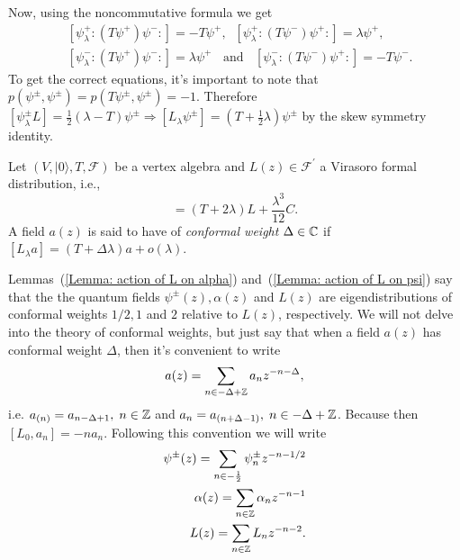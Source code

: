 Now, using the noncommutative formula we get
\begin{equation}
\begin{split}
     &[\psi^+_\lambda :(T\psi^+)\psi^-:]=-T\psi^+,\;\;[\psi^+_\lambda:(T\psi^-)\psi^+:]=\lambda\psi^+,\\
      &[\psi^-_\lambda :(T\psi^+)\psi^-:]=\lambda\psi^+\;\;\text{ and }\;\;[\psi^-_\lambda:(T\psi^-)\psi^+:]=-T\psi^-.
\end{split}
\end{equation}
To get the correct equations, it's important to note that $p(\psi^\pm,\psi^\pm)=p(T\psi^\pm,\psi^\pm)=-1$. Therefore $[\psi^\pm_\lambda L]=\frac{1}{2}(\lambda-T)\psi^\pm\Rightarrow [L_\lambda\psi^\pm]=(T+\frac{1}{2}\lambda)\psi^\pm$ by the skew symmetry identity.
\begin{dang}
    \begin{definition}\cite{kac2013bombay}
        Let $(V,|0\rangle,T,\mathcal{F})$ be a vertex algebra and $L(z)\in\mathcal{F}^\prime$ a Virasoro formal distribution, i.e.,
        \begin{equation}
            [L_\lambda L]=(T+2\lambda)L+\frac{\lambda^3}{12}C.
        \end{equation}
        A field $a(z)$ is said to have of \textit{conformal weight} $\Delta\in\mathbb{C}$ if 
        $[L_\lambda a]=(T+\Delta\lambda)a+o(\lambda)$.
    \end{definition}
\end{dang}
Lemmas~(\ref{Lemma: action of L on alpha}) and~(\ref{Lemma: action of L on psi}) say that the the quantum fields $\psi^\pm(z), \alpha(z)$ and $L(z)$ are eigendistributions of conformal weights $1/2, 1$ and $2$ relative to $L(z)$, respectively. We will not delve into the theory of conformal weights, but just say that when a field $a(z)$ has conformal weight $\Delta$, then it's convenient to write 
\begin{equation}\label{Equation: eigendstribution of conformal weight Delta notation}
    a(z)=\sum_{n\in-\Delta+\mathbb{Z}}a_nz^{-n-\Delta},
\end{equation}
i.e. $a_{(n)}=a_{n-\Delta+1},\;n\in\mathbb{Z}$ and $a_n=a_{(n+\Delta-1)},\;n\in-\Delta+\mathbb{Z}$. Because then 
$[L_0,a_n]=-na_n$. Following this convention we will write
\begin{equation}\label{Equation: conformal weight convention}
    \begin{split}
        \psi^\pm(z)=\sum_{n\in-\frac{1}{2}}\psi^\pm_nz^{-n-1/2}\\
        \alpha(z)=\sum_{n\in\mathbb{Z}}\alpha_nz^{-n-1}\\
        L(z)=\sum_{n\in\mathbb{Z}}L_nz^{-n-2}.
    \end{split}
\end{equation}
